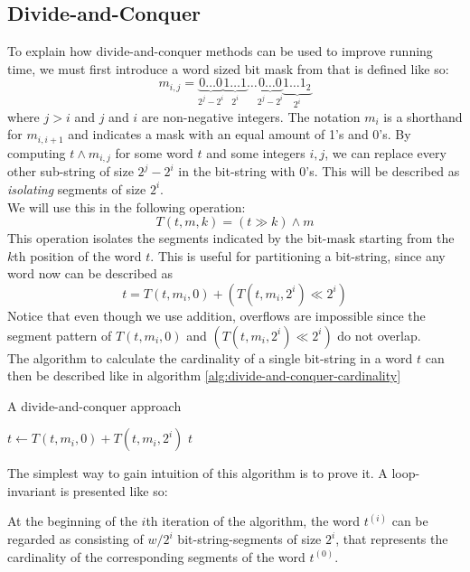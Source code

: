 \subsection{Divide-and-Conquer}
To explain how divide-and-conquer methods can be used to improve running time, we must first introduce a word sized bit mask from \cite{fast-similarity-search} that is defined like so:
$$m_{i,j} = \underbrace{0\dots 0}_{2^{j}-2^{i}}\underbrace{1\dots 1}_{2^i}\dots\underbrace{0\dots 0}_{2^{j}-2^{i}}\underbrace{1\dots 1_2}_{2^i}$$
where $j > i$ and $j$ and $i$ are non-negative integers. The notation $m_{i}$ is a shorthand for $m_{i, i+1}$ and indicates a mask with an equal amount of 1's and 0's. By computing $t \land m_{i,j}$ for some word $t$ and some integers $i, j$, we can replace every other sub-string of size $2^j-2^i$ in the bit-string with 0's. This will be described as \textit{isolating} segments of size $2^i$.\\
We will use this in the following operation:
\begin{equation}
    T(t, m, k) = (t\gg k) \land m
\end{equation}
This operation isolates the segments indicated by the bit-mask starting from the $k$th position of the word $t$. This is useful for partitioning a bit-string, since any word now can be described as
$$t=T(t, m_i, 0) + (T(t, m_i, 2^i) \ll 2^i)$$
Notice that even though we use addition, overflows are impossible since the segment pattern of $T(t, m_i, 0)$ and $(T(t, m_i, 2^i) \ll 2^i)$ do not overlap.\\
The algorithm to calculate the cardinality of a single bit-string in a word $t$ can then be described like in algorithm \ref{alg:divide-and-conquer-cardinality}
\begin{algorithm}[H]
\caption{A divide-and-conquer approach}\label{alg:divide-and-conquer-cardinality}
\begin{algorithmic}[1]
\State $t \gets T(t, m_i, 0) + T(t, m_i, 2^i)$
\EndFor
\State \Return $t$
\EndFunction
\end{algorithmic}
\end{algorithm}
The simplest way to gain intuition of this algorithm is to prove it. A loop-invariant is presented like so:
\begin{invariant}
\label{thm:divide-invariant}
At the beginning of the $i$th iteration of the algorithm, the word $t^{(i)}$ can be regarded as consisting of $w/2^i$ bit-string-segments of size $2^i$, that represents the cardinality of the corresponding segments of the word $t^{(0)}$.
\end{invariant}
